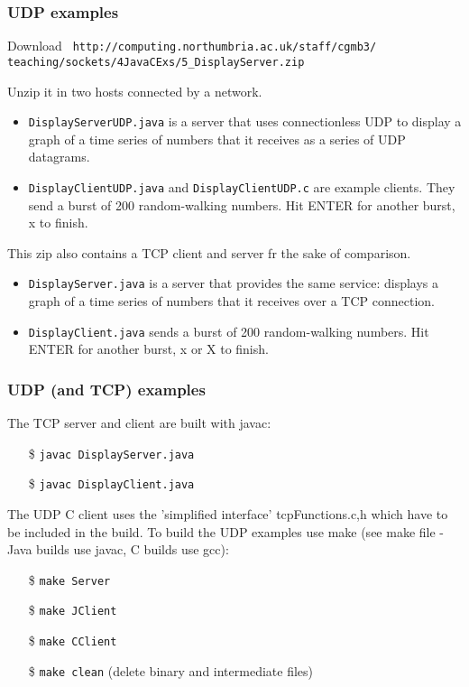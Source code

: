 \documentclass[10pt, hyperref={pdfpagelabels=false}]{beamer}
\begin{document}
\begin{frame}
\frametitle{UDP examples}
Download \texttt{\color{blue} \small http://computing.northumbria.ac.uk/staff/cgmb3/\\teaching/sockets/4JavaCExs/5\_DisplayServer.zip}

Unzip it in two hosts connected by a network.
\begin{itemize}
\item \texttt{DisplayServerUDP.java} is a server that uses connectionless UDP to display a graph of a time series of numbers that it receives as a series of UDP datagrams. 
\item \texttt{DisplayClientUDP.java} and \texttt{DisplayClientUDP.c} are example clients. They send a burst of 200 random-walking numbers. Hit ENTER for another burst, x to finish.
\end{itemize}

This zip also contains a TCP client and server fr the sake of comparison. 
\begin{itemize}
\item \texttt{DisplayServer.java} is a server that provides the same service: displays a graph of a time series of numbers that it receives over a TCP connection.
\item \texttt{DisplayClient.java} sends a burst of 200 random-walking numbers. Hit ENTER for another burst, x or X to finish.
\end{itemize}
\end{frame}

\begin{frame}
\frametitle{UDP (and TCP) examples}

The TCP server and client are built with javac:
\begin{itemize}
\item[\$] \texttt{javac DisplayServer.java}
\item[\$] \texttt{javac DisplayClient.java}
\end{itemize}

The UDP C client uses the 'simplified interface' tcpFunctions.{c,h} which have to be included in the build. To build the UDP examples use make (see make file - Java builds use javac, C builds use gcc):
\begin{itemize}
\item[\$] \texttt{make Server}
\item[\$] \texttt{make JClient}
\item[\$] \texttt{make CClient}
\item[\$] \texttt{make clean} (delete binary and intermediate files)
\end{itemize}
\end{frame}
\end{document}
